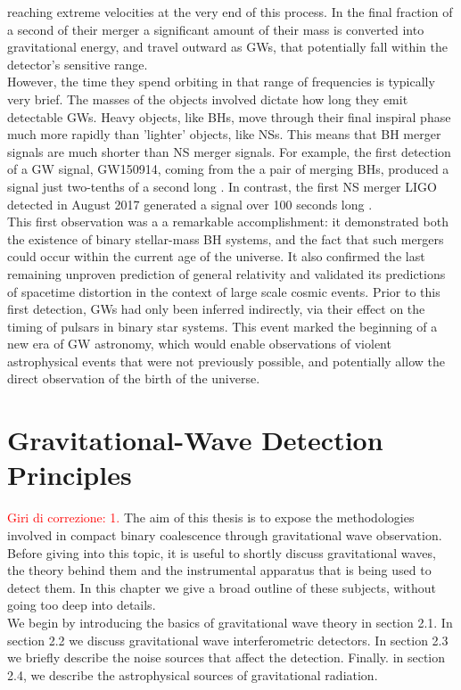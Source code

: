 \documentclass[binding=0.6cm, LaM]{sapthesis}
\newcommand{\fpg}[1]{\textcolor{red}{#1} }
\begin{document}
	reaching extreme velocities at the very end of this process. 
	In the final fraction of a second of their merger a significant amount of their mass is converted into gravitational energy, 
	and travel outward as GWs, that potentially fall within the detector’s sensitive range. \\
	However, the time they spend orbiting in that range of frequencies is typically very brief.
        The masses of the objects involved dictate how long they emit detectable GWs. 
        Heavy objects, like BHs, move through their final inspiral phase much more rapidly than 'lighter' objects, 
        like NSs. This means that BH  merger signals are much shorter than NS merger signals.
        For example, the first detection of a GW signal, GW150914, coming from the a pair of merging BHs, 
	produced a signal just two-tenths of a second long \cite{14}. 
        In contrast, the first NS merger LIGO detected in August 2017 generated a signal over 100 seconds long \cite{15}. \\
	This first observation was a a remarkable accomplishment: it demonstrated both the existence of binary stellar-mass BH systems, 
	and the fact that such mergers could occur within the current age of the universe.  
	It also confirmed the last remaining unproven prediction of general relativity and validated 
	its predictions of spacetime distortion in the context of large scale cosmic events. 
	Prior to this first detection, GWs had only been inferred indirectly,
        via their effect on the timing of pulsars in binary star systems.
	This event  marked the beginning of a new era of GW astronomy, 
	which would enable observations of violent astrophysical events that were not previously possible, 
	and potentially allow the direct observation of the birth of the universe.


\chapter{Gravitational-Wave Detection Principles}
\fpg{Giri di correzione: 1.}%
	The aim of this thesis is to expose the methodologies involved 
	in compact binary coalescence through gravitational wave observation. 
	Before giving into this topic, it is useful to shortly discuss gravitational waves, 
	the theory behind them and the instrumental apparatus that is being used to detect them. 
	In this chapter we give a broad outline of these subjects, 
	without going too deep into details. \\
	We begin by introducing the basics of gravitational wave theory in section 2.1. 
	In section 2.2 we discuss gravitational wave interferometric detectors. 
	In section 2.3 we briefly describe the noise sources that affect the detection. 
	Finally. in section 2.4, we describe the astrophysical sources of gravitational radiation.
\end{document}
